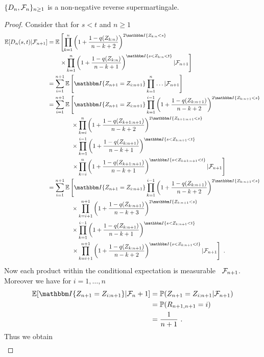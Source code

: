 %
\begin{lemma} \label{lem:dn_supermart}
	$\{D_n, \mathcal{F}_n\}_{n\geq 1}$ is a non-negative reverse supermartingale.
	\begin{proof}
		Consider that for $s<t$ and $n\geq 1$
		\begin{align*}
		\E[D_n(s,t)| \F_{n+1}] &= \E\left[\prod_{k=1}^{n}\left(1+\frac{1-q(Z_{k:n})}{n-k+2}\right)^{2\I{Z_{k:n} <s}}\right.\\
		&\qquad \left. \times \prod_{k=1}^{n}\left(1+\frac{1-q(Z_{k:n})}{n-k+1}\right)^\I{s < Z_{k:n} < t} | \F_{n+1}\right]\\
		&= \sum_{i=1}^{n+1}\E\left[\I{Z_{n+1} = Z_{i:n+1}} \prod_{k=1}^{n}\dots | \F_{n+1}\right]\\
		&= \sum_{i=1}^{n+1}\E\left[\I{Z_{n+1} = Z_{i:n+1}} \prod_{k=1}^{i-1}\left(1+\frac{1-q(Z_{k:n+1})}{n-k+2}\right)^{2\I{Z_{k:n+1} <s}} \right.\\
		&\qquad\qquad \times \prod_{k=i}^{n}\left(1+\frac{1-q(Z_{k+1:n+1})}{n-k+2}\right)^{2\I{Z_{k+1:n+1} <s}}\\
		&\qquad\qquad \times \prod_{k=1}^{i-1}\left(1+\frac{1-q(Z_{k:n+1})}{n-k+1}\right)^\I{s < Z_{k:n+1} < t}\\
		&\qquad\qquad \left. \times \prod_{k=i}^{n}\left(1+\frac{1-q(Z_{k+1:n+1})}{n-k+1}\right)^\I{s < Z_{k+1:n+1} < t}| \F_{n+1}\right]\\
		&= \sum_{i=1}^{n+1}\E\left[\I{Z_{n+1} = Z_{i:n+1}} \prod_{k=1}^{i-1}\left(1+\frac{1-q(Z_{k:n+1})}{n-k+2}\right)^{2\I{Z_{k:n+1} <s}} \right.\\
		&\qquad\qquad \times \prod_{k=i+1}^{n+1}\left(1+\frac{1-q(Z_{k:n+1})}{n-k+3}\right)^{2\I{Z_{k:n+1} <s}}\\
		&\qquad\qquad \times \prod_{k=1}^{i-1}\left(1+\frac{1-q(Z_{k:n+1})}{n-k+1}\right)^\I{s < Z_{k:n+1} < t}\\
		&\qquad\qquad \left. \times \prod_{k=i+1}^{n+1}\left(1+\frac{1-q(Z_{k:n+1})}{n-k+2}\right)^\I{s < Z_{k:n+1} < t}| \F_{n+1}\right]\mdot
		\end{align*}
		Now each product within the conditional expectation is measurable \wrt\ $\mathcal{F}_{n+1}$. Moreover we have for $i=1,\dots,n$ 
		\begin{align*}
		\E[\I{Z_{n+1}=Z_{i:n+1}}|\F_n+1] &= \P(Z_{n+1}=Z_{i:n+1}|\F_{n+1})\\
		&= \P(R_{n+1,n+1} = i)\\
		&= \frac{1}{n+1}\mdot
		\end{align*}
		Thus we obtain
		\begin{align*}

\end{align*}
\end{proof}
\end{lemma}
